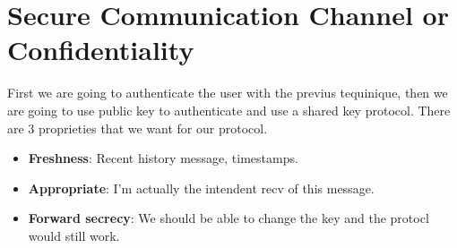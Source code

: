 \documentclass{article}
\begin{document}
    \section{Secure Communication Channel or Confidentiality}
      First we are going to authenticate the user with the previus tequinique, then we are 
      going to use public key to authenticate and use a shared key protocol. There are 3
      proprieties that we want for our protocol.
      \begin{itemize}
        \item\textbf{Freshness}: Recent history message, timestamps.
        \item\textbf{Appropriate}: I'm actually the intendent recv of this message.
        \item\textbf{Forward secrecy}: We should be able to change the key and the protocl
          would still work.
      \end{itemize}
\end{document}
